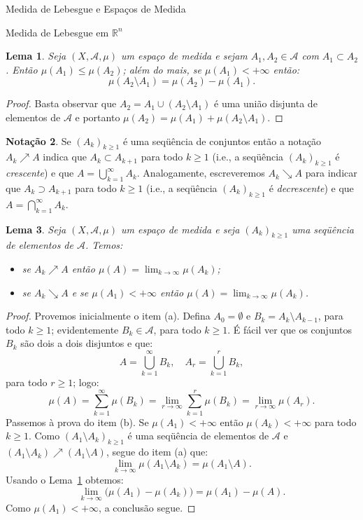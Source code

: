 \documentclass[oneside,final,11pt]{amsbook}
\newcommand{\R}{\mathds R}
\theoremstyle{remark}\newtheorem{exercise}{Exercício}[chapter]
\theoremstyle{remark}\newtheorem{*exercise}[exercise]{\hbox to 0pt{\hskip 0pt minus 1fil*}Exercício}
\theoremstyle{definition}\newtheorem{exdefin}{Definição}[chapter]
\theoremstyle{plain}\newtheorem{teo}{Teorema}[section]
\theoremstyle{plain}\newtheorem{lem}[teo]{Lema}
\theoremstyle{plain}\newtheorem{prop}[teo]{Proposição}
\theoremstyle{plain}\newtheorem{cor}[teo]{Corolário}
\theoremstyle{definition}\newtheorem{defin}[teo]{Definição}
\theoremstyle{remark}\newtheorem{rem}[teo]{Observação}
\theoremstyle{definition}\newtheorem{notation}[teo]{Notação}
\theoremstyle{definition}\newtheorem{convention}[teo]{Convenção}
\theoremstyle{definition}\newtheorem{example}[teo]{Exemplo}
\numberwithin{section}{chapter}
\numberwithin{equation}{section}
\begin{document}
\begin{chapter}{Medida de Lebesgue e Espaços de Medida}
\begin{section}[Medida de Lebesgue em $\R^n$]{Medida de Lebesgue em ${\R^n}$}
\begin{lem}\label{thm:muAminusB}
Seja $(X,\mathcal A,\mu)$ um espaço de medida e sejam $A_1,A_2\in\mathcal A$
com $A_1\subset A_2$. Então $\mu(A_1)\le\mu(A_2)$; além do mais, se $\mu(A_1)<+\infty$ então:
\[\mu(A_2\setminus A_1)=\mu(A_2)-\mu(A_1).\]
\end{lem}
\begin{proof}
Basta observar que $A_2=A_1\cup(A_2\setminus A_1)$ é uma união disjunta de elementos de $\mathcal A$ e
portanto $\mu(A_2)=\mu(A_1)+\mu(A_2\setminus A_1)$.
\end{proof}

\begin{notation}
Se $(A_k)_{k\ge1}$ é uma seqüência de conjuntos então a notação $A_k\nearrow A$ indica que
$A_k\subset A_{k+1}$ para todo $k\ge1$ (i.e., a seqüência $(A_k)_{k\ge1}$ é {\em crescente})
e que $A=\bigcup_{k=1}^\infty A_k$. Analogamente, escreveremos $A_k\searrow A$ para indicar que
$A_k\supset A_{k+1}$ para todo $k\ge1$ (i.e., a seqüência $(A_k)_{k\ge1}$ é {\em decrescente})
e que $A=\bigcap_{k=1}^\infty A_k$.
\end{notation}

\begin{lem}\label{thm:setlimits}
Seja $(X,\mathcal A,\mu)$ um espaço de medida e seja $(A_k)_{k\ge1}$ uma se\-qüên\-cia de elementos de $\mathcal A$. Temos:
\begin{itemize}
\item[(a)] se $A_k\nearrow A$ então $\mu(A)=\lim_{k\to\infty}\mu(A_k)$;
\item[(b)] se $A_k\searrow A$ e se $\mu(A_1)<+\infty$ então $\mu(A)=\lim_{k\to\infty}\mu(A_k)$.
\end{itemize}
\end{lem}
\begin{proof}
Provemos inicialmente o item (a). Defina $A_0=\emptyset$ e $B_k=A_k\setminus A_{k-1}$, para todo $k\ge1$;
evidentemente $B_k\in\mathcal A$, para todo $k\ge1$. É fácil ver que os conjuntos $B_k$ são dois a dois disjuntos e
que:
\[A=\bigcup_{k=1}^\infty B_k,\quad A_r=\bigcup_{k=1}^r B_k,\]
para todo $r\ge1$; logo:
\[\mu(A)=\sum_{k=1}^\infty\mu(B_k)=\lim_{r\to\infty}\sum_{k=1}^r\mu(B_k)=\lim_{r\to\infty}\mu(A_r).\]
Passemos à prova do item (b). Se $\mu(A_1)<+\infty$ então
$\mu(A_k)<+\infty$ para todo $k\ge1$. Como $(A_1\setminus A_k)_{k\ge1}$ é uma
seqüência de elementos de $\mathcal A$ e $(A_1\setminus A_k)\nearrow
(A_1\setminus A)$, segue do item (a) que:
\[\lim_{k\to\infty}\mu(A_1\setminus A_k)=\mu(A_1\setminus A).\]
Usando o Lema~\ref{thm:muAminusB} obtemos:
\[\lim_{k\to\infty}\big(\mu(A_1)-\mu(A_k)\big)=\mu(A_1)-\mu(A).\]
Como $\mu(A_1)<+\infty$, a conclusão segue.
\end{proof}


\end{section}
\end{chapter}
\end{document}
